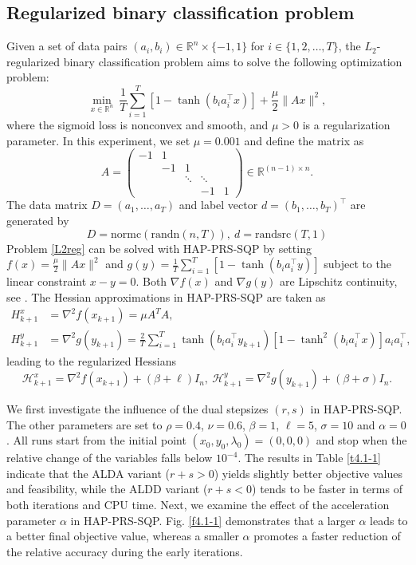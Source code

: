 \documentclass[pdflatex,sn-mathphys-num]{sn-jnl}%
\theoremstyle{thmstyleone}%
\theoremstyle{thmstyletwo}%
\theoremstyle{thmstylethree}%
\begin{document}
\subsection{Regularized binary classification problem}\label{subsec:class}
Given a set of data pairs $(a_i, b_i) \in \mathbb{R}^n \times\{-1,1\}$ for $i\in \{1,2,\dots,T\}$, the $L_2$-regularized binary classification problem \cite{JZY22,MXC19} aims to solve the following optimization problem:
\begin{equation}\label{L2reg}
	\min_{x \in \mathbb{R}^n}~\frac{1}{T} \sum_{i=1}^T[1-\tanh (b_i a_i^{\top} x)]+\frac{\mu}{2}\|Ax\|^2,
\end{equation}
where the sigmoid loss is nonconvex and smooth, and $\mu>0$ is a regularization parameter. In this experiment, we set $\mu  = 0.001$ and define the matrix as
\[
A=\left(\begin{array}{ccccc}
	-1 & 1 & & &\\
	& -1 & 1 & &\\
	& & \ddots & \ddots &\\
	& & & -1 & 1
\end{array}\right) \in \mathbb{R}^{(n-1) \times n}.
\]
The data matrix $D=(a_1,\dots,a_T)$ and label vector $d=(b_1,\dots,b_T)^\top$ are generated by
\[D=\text{normc}(\text{randn}(n,T)),~d=\text{randsrc}(T,1)\]
Problem \eqref{L2reg} can be solved with HAP-PRS-SQP by setting $f(x)=\frac{\mu}{2}\|Ax\|^2$ and $g(y)=\frac{1}{T} \sum_{i=1}^T[1-\tanh (b_i a_i^{\top} y)]$ subject to the linear constraint $x-y=0$. Both $\nabla f(x)$ and $\nabla g(y)$ are Lipschitz continuity, see \cite[Section 6.2]{YTJ24}. The Hessian approximations in HAP-PRS-SQP are taken as
\[
\begin{aligned}
	H^x_{k+1}&=\nabla^2 f(x_{k+1})=\mu A^TA,\\
	H^y_{k+1}&=\nabla^2 g(y_{k+1})=\frac{2}{T} \sum_{i=1}^T \tanh (b_i a_i^{\top} y_{k+1})\left[1-\tanh ^2(b_i a_i^{\top} x)\right] a_i a_i^{\top},
\end{aligned}
\]
leading to the regularized Hessians
\[
\mathcal{H}_{k+1}^x=\nabla^2 f(x_{k+1})+ (\beta+\ell) I_n,~\mathcal{H}_{k+1}^y=\nabla^2 g(y_{k+1})+(\beta+\sigma) I_n.
\] 


We first investigate the influence of the dual stepsizes $(r,s)$ in HAP-PRS-SQP. The other parameters are set to $\rho=0.4$, $\nu=0.6$, $\beta=1$, $\ell=5$, $\sigma=10$ and $\alpha=0$. All runs start from the initial point $(x_0,y_0,\lambda_0)=(0,0,0)$ and stop when the relative change of the variables falls below $10^{-4}$. 
The results in Table \ref{t4.1-1} indicate that the ALDA variant ($r+s>0$) yields slightly better objective values and feasibility, while the ALDD variant ($r+s<0$) tends to be faster in terms of both iterations and CPU time. 
Next, we examine the effect of the acceleration parameter $\alpha$ in HAP-PRS-SQP. Fig. \ref{f4.1-1} demonstrates that a larger $\alpha$ leads to a better final objective value, whereas a smaller $\alpha$ promotes a faster reduction of the relative accuracy during the early iterations.
\end{document}
